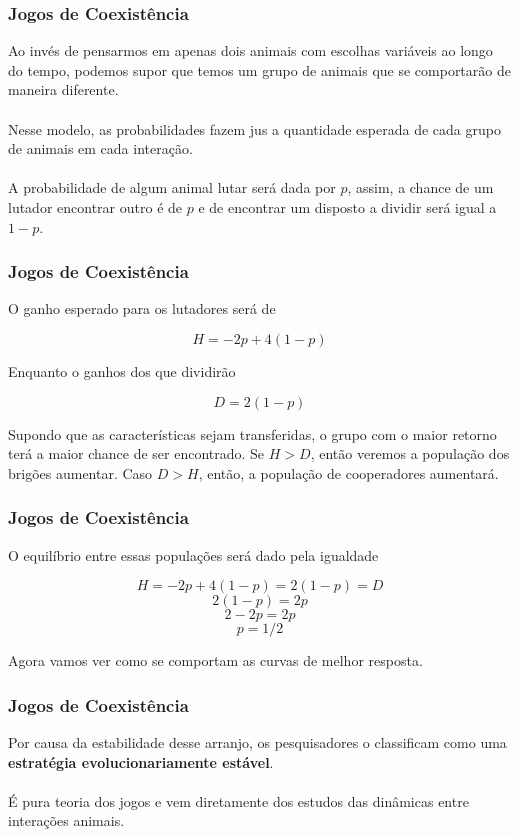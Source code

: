 \documentclass{beamer}[10]
\begin{document}
\begin{frame}
	\frametitle{Jogos de Coexistência}

	Ao invés de pensarmos em apenas dois animais com escolhas variáveis ao longo do tempo, podemos supor que temos um grupo de animais que se comportarão de maneira diferente. 
	\\~\\
	Nesse modelo, as probabilidades fazem jus a quantidade esperada de cada grupo de animais em cada interação.
	\\~\\
	A probabilidade de algum animal lutar será dada por $p$, assim, a chance de um lutador encontrar outro é de $p$ e de encontrar um disposto a dividir será igual a $1 - p$.

\end{frame}

\begin{frame}
	\frametitle{Jogos de Coexistência}

	O ganho esperado para os lutadores será de

	$$H = -2p + 4(1-p)$$

	Enquanto o ganhos dos que dividirão

	$$D = 2(1-p)$$

	Supondo que as características sejam transferidas, o grupo com o maior retorno terá a maior chance de ser encontrado. Se $H > D$, então veremos a população dos brigões aumentar. Caso $D > H$, então, a população de cooperadores aumentará.

\end{frame}

\begin{frame}
	\frametitle{Jogos de Coexistência}

	O equilíbrio entre essas populações será dado pela igualdade

	$$H = -2p + 4(1-p) = 2(1-p) = D$$
	$$2(1-p) = 2p$$
	$$2 - 2p = 2p$$
	$$p = 1/2$$

	Agora vamos ver como se comportam as curvas de melhor resposta.

\end{frame}

\begin{frame}
	\frametitle{Jogos de Coexistência}

	Por causa da estabilidade desse arranjo, os pesquisadores o classificam como uma \textbf{estratégia evolucionariamente estável}. 
	\\~\\
	É pura teoria dos jogos e vem diretamente dos estudos das dinâmicas entre interações animais.

\end{frame}
\end{document}
